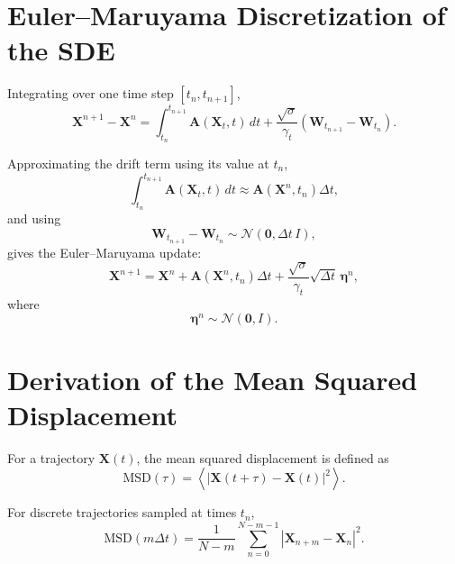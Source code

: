 \section{Euler--Maruyama Discretization of the SDE}

Integrating over one time step \([t_n,t_{n+1}]\),
\begin{equation}
\mathbf{X}^{n+1}-\mathbf{X}^{n}
=
\int_{t_n}^{t_{n+1}}
\mathbf{A}(\mathbf{X}_t,t)\,dt
+
\frac{\sqrt{\sigma}}{\gamma_t}
\left(
\mathbf{W}_{t_{n+1}}-\mathbf{W}_{t_n}
\right).
\end{equation}

Approximating the drift term using its value at \(t_n\),
\begin{equation}
\int_{t_n}^{t_{n+1}}
\mathbf{A}(\mathbf{X}_t,t)\,dt
\approx
\mathbf{A}(\mathbf{X}^{n},t_n)\Delta t,
\end{equation}
and using
\begin{equation}
\mathbf{W}_{t_{n+1}}-\mathbf{W}_{t_n}
\sim
\mathcal{N}(\mathbf{0},\Delta t\,I),
\end{equation}
gives the Euler--Maruyama update:
\begin{equation}
\mathbf{X}^{n+1}
=
\mathbf{X}^{n}
+
\mathbf{A}(\mathbf{X}^{n},t_n)\Delta t
+
\frac{\sqrt{\sigma}}{\gamma_t}
\sqrt{\Delta t}\,\boldsymbol{\eta}^{n},
\end{equation}
where
\begin{equation}
\boldsymbol{\eta}^{n}
\sim
\mathcal{N}(\mathbf{0},I).
\end{equation}

\section{Derivation of the Mean Squared Displacement}

For a trajectory \(\mathbf{X}(t)\), the mean squared displacement is defined as
\begin{equation}
\mathrm{MSD}(\tau)
=
\left\langle
\left|
\mathbf{X}(t+\tau)-\mathbf{X}(t)
\right|^2
\right\rangle.
\end{equation}

For discrete trajectories sampled at times \(t_n\),
\begin{equation}
\mathrm{MSD}(m\Delta t)
=
\frac{1}{N-m}
\sum_{n=0}^{N-m-1}
\left|
\mathbf{X}_{n+m}-\mathbf{X}_n
\right|^2.
\end{equation}


